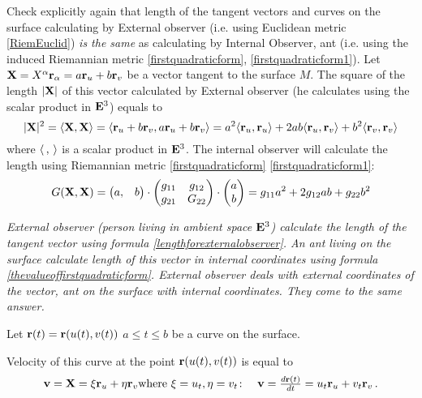 \documentclass[12pt]{article}
\theoremstyle{theorem}
\numberwithin{equation}{section}
\begin{document}
Check explicitly again that  length of the tangent vectors and curves on the surface
calculating by External observer (i.e. using Euclidean metric \eqref{RiemEuclid})
{\it is the same} as calculating by Internal Observer, ant
(i.e. using the induced Riemannian metric \eqref{firstquadraticform}, \eqref{firstquadraticform1}).
 Let ${\bf X}=X^\alpha{\bf r}_\alpha=a{\bf r}_u+b{\bf r}_v$ be a vector tangent to the surface $M$.
  The square of the length $|{\bf X}|$ of this vector calculated by External observer
  (he calculates using the scalar product in ${\bf E}^3$) equals to
\begin{equation}\label{lengthforexternalobserver}
 |{\bf X}|^2=\langle{\bf X},{\bf X}\rangle=\langle{\bf r}_u+b{\bf r}_v,a{\bf r}_u+b{\bf r}_v\rangle=a^2\langle{\bf r}_u,{\bf r}_u\rangle+
   2ab\langle{\bf r}_u,{\bf r}_v\rangle+b^2\langle{\bf r}_v,{\bf r}_v\rangle
\end{equation}
where $\langle\,,\,\rangle$ is a scalar product in ${\bf E}^3$.
The internal observer will calculate the length using Riemannian metric \eqref{firstquadraticform}
\eqref{firstquadraticform1}:
\begin{equation}\label{thevalueoffirstquadraticform}
  G({\bf X},{\bf X})=
  \begin{pmatrix}
   a, &b
  \end{pmatrix}
   \cdot
   \begin{pmatrix}
   g_{11} & g_{12} \\
   g_{21}& G_{22} \\
   \end{pmatrix}\cdot
  \begin{pmatrix}
   a\\ b\\
  \end{pmatrix}=
  g_{11}a^2+2g_{12}ab+g_{22}b^2
\end{equation}

{\it External observer (person living in ambient space ${\bf E}^3$) calculate the length
of the tangent vector  using formula
\eqref{lengthforexternalobserver}. An ant living on the surface
calculate length of this vector in internal coordinates using formula
\eqref{thevalueoffirstquadraticform}. External observer deals
with external coordinates of the vector, ant on the surface with internal coordinates.
 They come to the same answer.}


\smallskip



  Let ${\bf r}(t)={\bf r}(u(t),v(t))$ $a\leq t\leq b$ be a curve on the surface.


  Velocity of this curve at the  point ${\bf r}(u(t),v(t))$ is equal to
  $$
  {\bf v}={\bf X}=\xi {\bf r}_u+\eta{\bf r}_v
  \hbox
  {where
  $\xi=u_t,\eta=v_t\colon\quad {\bf v}={d{\bf r}(t)\over dt}=
    u_t{\bf r}_u+v_t{\bf r}_v$}
  \,.
  $$
\end{document}
